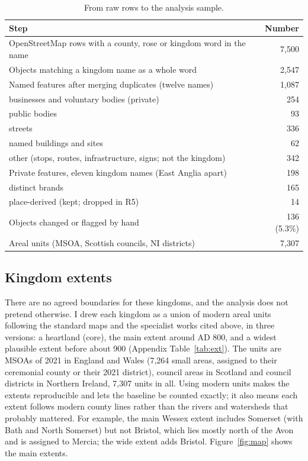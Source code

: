 \documentclass[11pt,a4paper]{article}
\begin{document}
\begin{table}[tbp]\centering\small\caption{From raw rows to the analysis sample.}\label{tab:flow}\begin{tabular}{lr}\toprule Step & Number\\\midrule
OpenStreetMap rows with a county, rose or kingdom word in the name & 7,500\\
Objects matching a kingdom name as a whole word & 2,547\\
Named features after merging duplicates (twelve names) & 1,087\\
\quad businesses and voluntary bodies (private) & 254\\
\quad public bodies & 93\\
\quad streets & 336\\
\quad named buildings and sites & 62\\
\quad other (stops, routes, infrastructure, signs; not the kingdom) & 342\\\midrule
Private features, eleven kingdom names (East Anglia apart) & 198\\
\quad distinct brands & 165\\
\quad place-derived (kept; dropped in R5) & 14\\
Objects changed or flagged by hand & 136 (5.3\%)\\
Areal units (MSOA, Scottish councils, NI districts) & 7,307\\\bottomrule\end{tabular}\end{table}

\subsection{Kingdom extents}
There are no agreed boundaries for these kingdoms, and the analysis does not pretend otherwise. I drew each kingdom as a union of modern areal units following the standard maps \citep{hill1981,yorke1990} and the specialist works cited above, in three versions: a heartland (core), the main extent around AD 800, and a widest plausible extent before about 900 (Appendix Table~\ref{tab:ext}). The units are MSOAs of 2021 in England and Wales (7,264 small areas, assigned to their ceremonial county or their 2021 district), council areas in Scotland and council districts in Northern Ireland, 7,307 units in all. Using modern units makes the extents reproducible and lets the baseline be counted exactly; it also means each extent follows modern county lines rather than the rivers and watersheds that probably mattered. For example, the main Wessex extent includes Somerset (with Bath and North Somerset) but not Bristol, which lies mostly north of the Avon and is assigned to Mercia; the wide extent adds Bristol. Figure~\ref{fig:map} shows the main extents.
\end{document}
